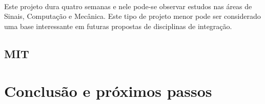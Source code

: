\documentclass[12pt]{article} %
\begin{document}
\paragraph{} Este projeto dura quatro semanas e nele pode-se observar estudos nas áreas de Sinais, Computação e Mecânica. Este tipo de projeto menor pode ser considerado uma base interessante em futuras propostas de disciplinas de integração.




\subsection{MIT}


\section{Conclusão e próximos passos}
\end{document}
